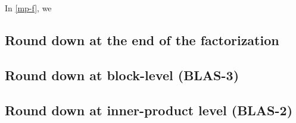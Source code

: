 In \cref{mp-f}, we 

\subsection{Round down at the end of the factorization}\label{sec:mp-f}
\subsection{Round down at block-level (BLAS-3)}\label{sec:mp-b}
\subsection{Round down at inner-product level (BLAS-2)}\label{sec:mp-2}





























